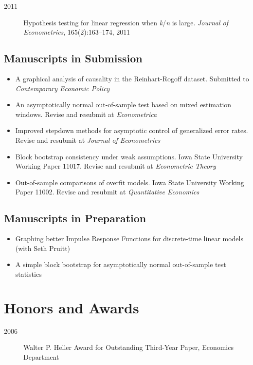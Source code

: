\documentclass[12pt]{article}%
\newcommand{\allcaps}[1]{\textls{\MakeUppercase{#1}}}
\begin{document}
\begin{description}
\item[2011] Hypothesis testing for linear regression when
\textit{k}/\textit{n} is large. \textit{Journal of Econometrics},
165(2):163--174, 2011
\end{description}
  
\subsection*{Manuscripts in Submission}

\begin{itemize}
\item A graphical analysis of causality in the Reinhart-Rogoff
  dataset. Submitted to \textit{Contemporary Economic Policy}
\item An asymptotically normal out-of-sample test based on mixed
  estimation windows. Revise and resubmit at \textit{Econometrica}
\item Improved stepdown methods for asymptotic control of generalized
  error rates. Revise and resubmit at \textit{Journal of Econometrics}
\item Block bootstrap consistency under weak assumptions. Iowa State
  University Working Paper 11017. Revise and resubmit at
  \textit{Econometric Theory}
\item Out-of-sample comparisons of overfit models. Iowa State
  University Working Paper 11002. Revise and resubmit at
  \textit{Quantitative Economics}
\end{itemize}
  
\subsection*{Manuscripts in Preparation}
\begin{itemize}
\item Graphing better Impulse Response Functions for discrete-time
  linear models (with Seth Pruitt)
\item A simple block bootstrap for asymptotically normal out-of-sample
  test statistics
\end{itemize}

\section*{Honors and Awards}

\begin{description}
\item[2006] Walter P. Heller Award for Outstanding Third-Year Paper,
\allcaps{UCSD} Economics Department
\end{description}
\end{document}
